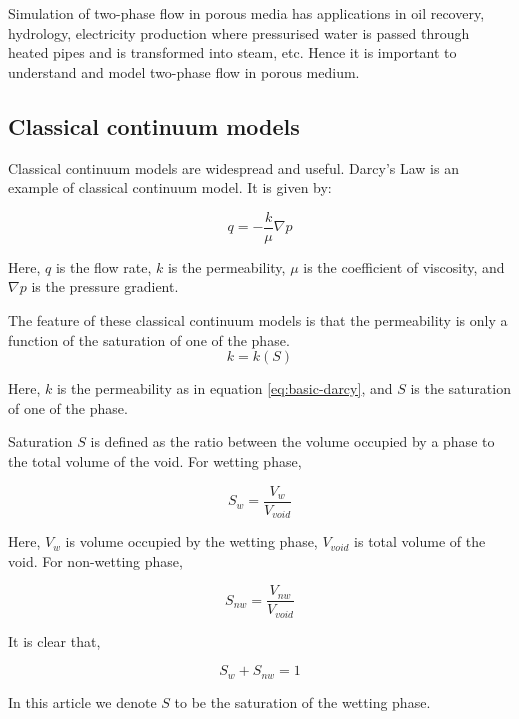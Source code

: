 Simulation of two-phase flow in porous media has applications in oil recovery, hydrology, electricity production where pressurised water is passed through heated pipes and is transformed into steam, etc. Hence it is important to understand and model two-phase flow in porous medium. \cite{labed2012experimental}
	
\subsection{Classical continuum models}

	Classical continuum models are widespread and useful. Darcy's Law is an example of classical continuum model. It is given by:
	
	\begin{equation}
		q = -\frac{k}{\mu} \nabla p
		\label{eq:basic-darcy}
	\end{equation}
	
	Here, $q$ is the flow rate,	$k$ is the permeability, $\mu$ is the coefficient of viscosity,	and $\nabla p$ is the pressure gradient.
	
	The feature of these classical continuum models is that the permeability is only a function of the saturation of one of the phase.
	\begin{equation}
		k = k(S)
	\end{equation}
	
	Here, $k$ is the permeability as in equation \ref{eq:basic-darcy}, and $S$ is the saturation of one of the phase.

	Saturation $S$ is defined as the ratio between the volume occupied by a phase to the total volume of the void. For wetting phase,

	\begin{equation}
		S_{w} = \frac{V_{w}}{V_{void}}
	\end{equation}
	
	Here, $V_{w}$ is volume occupied by the wetting phase, $V_{void}$ is total volume of the void. For non-wetting phase,
	
	\begin{equation}
		S_{nw} = \frac{V_{nw}}{V_{void}}
	\end{equation}
	
	It is clear that,
	
	\begin{equation}
		S_{w} + S_{nw} = 1
	\end{equation}
	
	In this article we denote $S$ to be the saturation of the wetting phase.
	
